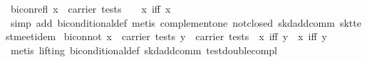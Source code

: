 \begin{isabellebody}
\endisatagproof
{\isafoldproof}%
%
\isadelimproof
\isanewline
%
\endisadelimproof
\isanewline
{}\isamarkupfalse%
\ bicon{}refl{}\ {}x\ {}\ carrier\ tests\ {}\ {}\ {}\ x\ iff\ x{}\isanewline
%
\isadelimproof
\ \ %
\endisadelimproof
%
\isatagproof
{}\isamarkupfalse%
\ {}simp\ add{}\ biconditional{}def{}\ {}metis\ complement{}one\ not{}closed\ skd{}add{}comm\ skt{}test{}meet{}idem{}%
\endisatagproof
{\isafoldproof}%
%
\isadelimproof
\isanewline
%
\endisadelimproof
\isanewline
{}\isamarkupfalse%
\ bicon{}not{}\ {}{}x\ {}\ carrier\ tests{}\ y\ {}\ carrier\ tests{}\ {}\ x\ iff\ y\ {}\ {}x\ iff\ {}y{}\isanewline
%
\isadelimproof
\ \ %
\endisadelimproof
%
\isatagproof
{}\isamarkupfalse%
\ {}metis\ {}lifting{}\ biconditional{}def\ skd{}add{}comm\ test{}double{}compl{}%
\endisatagproof
{\isafoldproof}%
%
\isadelimproof
\isanewline
%
\endisadelimproof
\isanewline
{}\isamarkupfalse%

\end{isabellebody}
